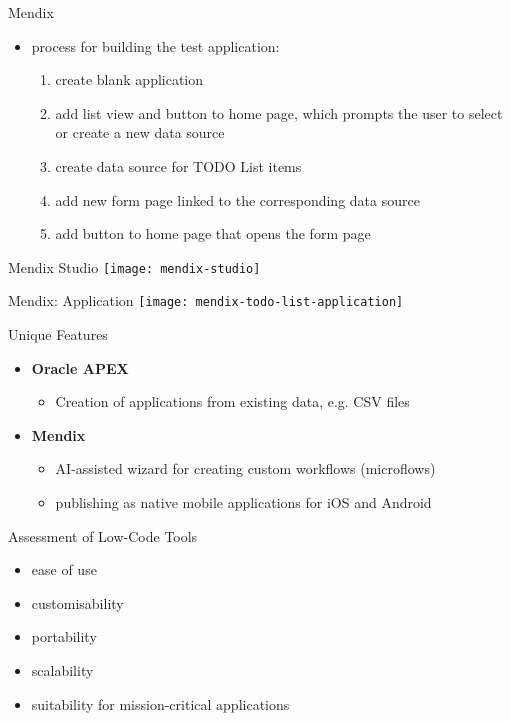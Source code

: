 \documentclass[aspectratio=169]{beamer}
\begin{document}
  \begin{frame}{Mendix}
    \begin{itemize}
      \item process for building the test application:
        \begin{enumerate}
          \item create blank application
          \item add list view and button to home page, which prompts the user to select or create a new data source
          \item create data source for TODO List items
          \item add new form page linked to the corresponding data source
          \item add button to home page that opens the form page
        \end{enumerate}
    \end{itemize}
  \end{frame}

  \begin{frame}[standout]{Mendix Studio}
    \texttt{[image: mendix-studio]}
  \end{frame}

  \begin{frame}[standout]{Mendix: Application}
    \texttt{[image: mendix-todo-list-application]}
  \end{frame}

  \begin{frame}{Unique Features}
    \begin{itemize}
      \item \textbf{Oracle APEX}
        \begin{itemize}
          \item Creation of applications from existing data, e.g. CSV files
        \end{itemize}
      \item \textbf{Mendix}
        \begin{itemize}
          \item AI-assisted wizard for creating custom workflows (microflows)
          \item publishing as native mobile applications for iOS and Android
        \end{itemize}
    \end{itemize}
  \end{frame}

  \begin{frame}{Assessment of Low-Code Tools}
    \begin{itemize}
      \item ease of use
      \item customisability
      \item portability
      \item scalability
      \item suitability for mission-critical applications
    \end{itemize}
  \end{frame}
\end{document}
